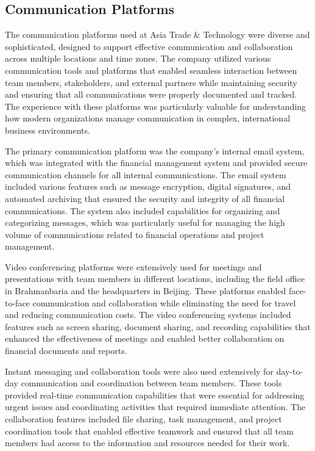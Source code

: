 \subsection{Communication Platforms}
The communication platforms used at Asia Trade \& Technology were diverse and sophisticated, designed to support effective communication and collaboration across multiple locations and time zones. The company utilized various communication tools and platforms that enabled seamless interaction between team members, stakeholders, and external partners while maintaining security and ensuring that all communications were properly documented and tracked. The experience with these platforms was particularly valuable for understanding how modern organizations manage communication in complex, international business environments.

The primary communication platform was the company's internal email system, which was integrated with the financial management system and provided secure communication channels for all internal communications. The email system included various features such as message encryption, digital signatures, and automated archiving that ensured the security and integrity of all financial communications. The system also included capabilities for organizing and categorizing messages, which was particularly useful for managing the high volume of communications related to financial operations and project management.

Video conferencing platforms were extensively used for meetings and presentations with team members in different locations, including the field office in Brahmanbaria and the headquarters in Beijing. These platforms enabled face-to-face communication and collaboration while eliminating the need for travel and reducing communication costs. The video conferencing systems included features such as screen sharing, document sharing, and recording capabilities that enhanced the effectiveness of meetings and enabled better collaboration on financial documents and reports.

Instant messaging and collaboration tools were also used extensively for day-to-day communication and coordination between team members. These tools provided real-time communication capabilities that were essential for addressing urgent issues and coordinating activities that required immediate attention. The collaboration features included file sharing, task management, and project coordination tools that enabled effective teamwork and ensured that all team members had access to the information and resources needed for their work.

